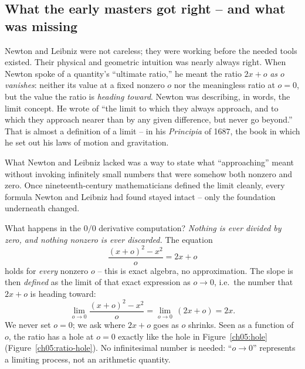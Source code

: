 \subsection{What the early masters got right -- and what was missing}

Newton and Leibniz were not careless; they were working before the needed tools existed. Their
physical and geometric intuition was nearly always right.
When Newton spoke of a quantity's ``ultimate ratio,'' he meant the ratio $2x+o$ \emph{as $o$
vanishes}: neither its value at a fixed nonzero $o$ nor the meaningless ratio at $o=0$, but
the value the ratio is \emph{heading toward}. Newton was describing, in
words, the limit concept. He wrote of ``the limit to which they always approach, and
to which they approach nearer than by any given difference, but never go beyond.'' That is almost
a definition of a limit -- in his \emph{Principia} of 1687, the book in which he set out his laws of
motion and gravitation.

What Newton and Leibniz lacked was a way to state what ``approaching'' meant without invoking infinitely small numbers that were somehow both nonzero and zero. Once nineteenth-century mathematicians defined the limit cleanly, every formula Newton and Leibniz had found stayed intact -- only the foundation underneath changed.

\begin{happeningbox}
What happens in the $0/0$ derivative computation? \emph{Nothing is ever divided by
zero, and nothing nonzero is ever discarded.} The equation
\[
  \frac{(x+o)^2-x^2}{o} = 2x+o
\]
holds for \emph{every} nonzero $o$ -- this is exact algebra, no approximation. The slope is then
\emph{defined} as the limit of that exact expression as $o\to 0$, i.e.\ the number that $2x+o$ is
heading toward:
\[
  \lim_{o\to 0} \frac{(x+o)^2-x^2}{o} = \lim_{o\to 0}\,(2x+o) = 2x.
\]
We never set $o=0$; we ask where $2x+o$ goes as $o$ shrinks. Seen as a function of $o$, the
ratio has a hole at $o=0$ exactly like the hole in Figure~\ref{ch05:hole}
(Figure~\ref{ch05:ratio-hole}).
No infinitesimal number is needed: ``$o\to 0$'' represents a limiting process, not an arithmetic
quantity.
\end{happeningbox}

